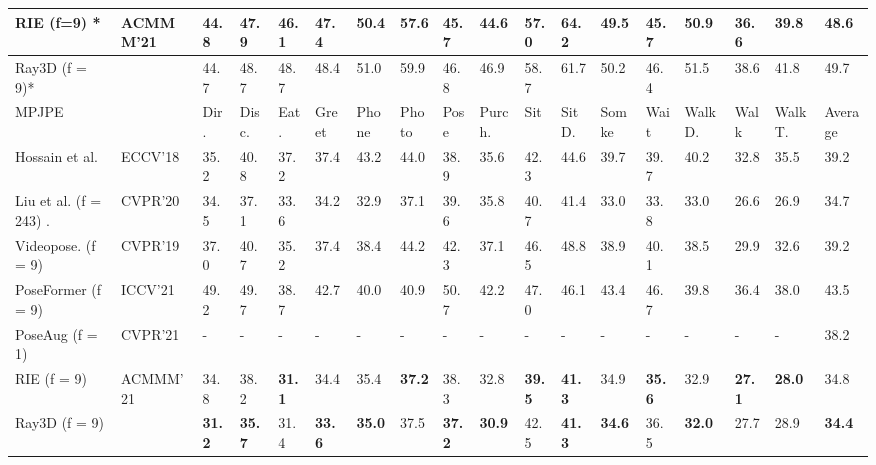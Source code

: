 \documentclass[10pt,twocolumn,letterpaper]{article}
\begin{document}
\begin{table*}[htbp]
\begin{tabular}{@{}l|llllllllllllllll|l@{}}
RIE (f=9) * \cite{wenkang2021improving}           &ACMMM'21 & 44.8  & 47.9  & 46.1  & 47.4  & 50.4  & 57.6  & 45.7   & 44.6  &57.0   & 64.2  & 49.5  & 45.7  & 50.9  & 36.6   & 39.8   & 48.6   \\ \hline
Ray3D (f = 9)*                  &                          & 44.7  & 48.7  & 48.7  & 48.4  & 51.0  & 59.9  & 46.8   & 46.9  & 58.7  & 61.7  & 50.2  & 46.4  & 51.5  & 38.6   & 41.8   & 49.7   \\ \bottomrule
\fi
\toprule
MPJPE          &                 & Dir.   & Disc. & Eat.  & Greet & Phone & Photo & Pose  & Purch. & Sit   & SitD. & Somke & Wait  & WalkD.& Walk  & WalkT. & Average\\ \midrule
Hossain et al. \cite{hossain2018exploiting}       &ECCV’18 & 35.2  & 40.8  & 37.2  & 37.4  & 43.2  & 44.0  & 38.9 & 35.6    & 42.3  & 44.6  & 39.7  & 39.7  & 40.2  & 32.8  & 35.5   & 39.2   \\
Liu et al. (f = 243) \cite{LiuSW0CA20}.     &CVPR’20 & 34.5  & 37.1  & 33.6  & 34.2  & 32.9  & 37.1  & 39.6 & 35.8    & 40.7  & 41.4  & 33.0  & 33.8  & 33.0  & 26.6  & 26.9   & 34.7   \\
Videopose. (f = 9) \cite{dario2019videopose}   &CVPR'19 & 37.0  & 40.7  & 35.2  & 37.4  & 38.4  & 44.2  & 42.3 & 37.1    & 46.5  & 48.8  & 38.9  & 40.1  & 38.5  & 29.9  & 32.6   & 39.2   \\
PoseFormer (f = 9) \cite{ce2021poseformer}        &ICCV'21 & 49.2  & 49.7  & 38.7  & 42.7  & 40.0  & 40.9  & 50.7 & 42.2    & 47.0  & 46.1  & 43.4  & 46.7  & 39.8  & 36.4  & 38.0   & 43.5   \\
PoseAug (f = 1) \cite{GongZF21}                   &CVPR'21 & -     & -     & -     & -     & -     & -     & -    & -       & -     & -     & -     & -     & -     & -     & -      & 38.2   \\
RIE (f = 9)~\cite{wenkang2021improving}                   &ACMMM'21 & 34.8  & 38.2  &\textbf{31.1}  & 34.4  & 35.4  & \textbf{37.2}  & 38.3  & 32.8  & \textbf{39.5} & \textbf{41.3} & 34.9   & \textbf{35.6}  & 32.9  & \textbf{27.1}  & \textbf{28.0}   & 34.8   \\ \hline
Ray3D (f = 9)                   &                 & \textbf{31.2}  & \textbf{35.7}  & 31.4 & \textbf{33.6} & \textbf{35.0}  & 37.5  & \textbf{37.2} & \textbf{30.9} & 42.5  & \textbf{41.3} & \textbf{34.6}   & 36.5  & \textbf{32.0}   & 27.7  & 28.9  & \textbf{34.4}   \\ \bottomrule
\end{tabular}
\label{table:1}
\\



\end{table*}
\end{document}
